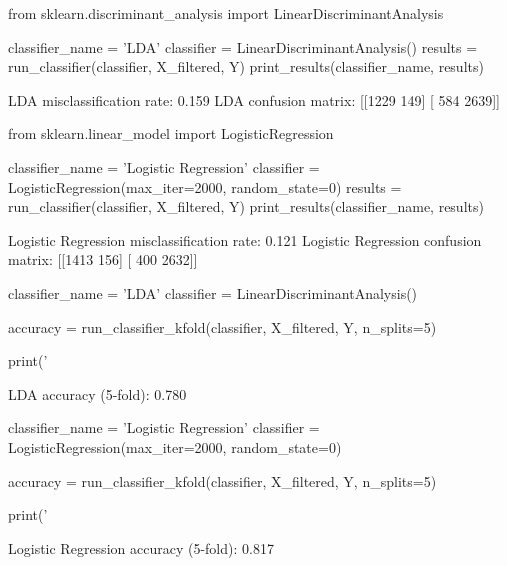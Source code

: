 \begin{python}
from sklearn.discriminant_analysis import LinearDiscriminantAnalysis

classifier_{n}ame = 'LDA'
classifier = LinearDiscriminantAnalysis()
results = run_classifier(classifier, X_filtered, Y)
print_results(classifier_{n}ame, results)
\end{python}

\begin{console}
LDA misclassification rate: 0.159
LDA confusion matrix:
[[1229  149]
 [ 584 2639]]
\end{console}

\begin{python}
from sklearn.linear_model import LogisticRegression

classifier_{n}ame = 'Logistic Regression'
classifier = LogisticRegression(max_{i}ter=2000, random_state=0)
results = run_classifier(classifier, X_filtered, Y)
print_results(classifier_{n}ame, results)
\end{python}

\begin{console}
Logistic Regression misclassification rate: 0.121
Logistic Regression confusion matrix:
[[1413  156]
 [ 400 2632]]
\end{console}

\begin{python}
classifier_{n}ame = 'LDA'
classifier = LinearDiscriminantAnalysis()

accuracy = run_classifier_{k}fold(classifier, X_filtered, Y, n_splits=5)

print('%
\end{python}

\begin{console}
LDA accuracy (5-fold): 0.780
\end{console}

\begin{python}
classifier_{n}ame = 'Logistic Regression'
classifier = LogisticRegression(max_{i}ter=2000, random_state=0)

accuracy = run_classifier_{k}fold(classifier, X_filtered, Y, n_splits=5)

print('%
\end{python}

\begin{console}
Logistic Regression accuracy (5-fold): 0.817
\end{console}

